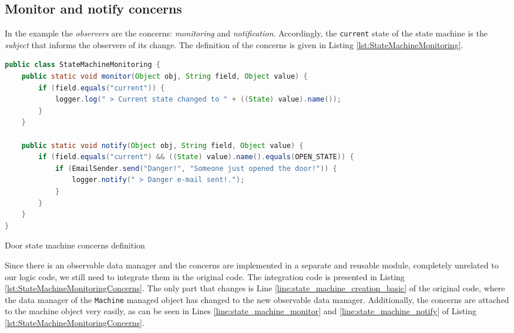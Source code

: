 \subsection{Monitor and notify concerns}
In the example the \textit{observers} are the concerns: \textit{monitoring} and \textit{notification}. 
Accordingly, the \texttt{current} state of the state machine is the \textit{subject} that informs the observers of its change.
The definition of the concerns is given in Listing \ref{lst:StateMachineMonitoring}.

\begin{sourcecode} [H]
	\begin{lstlisting}[language=Java, escapechar=|]
public class StateMachineMonitoring {
    public static void monitor(Object obj, String field, Object value) {
        if (field.equals("current")) {
            logger.log(" > Current state changed to " + ((State) value).name());
        }
    }

    public static void notify(Object obj, String field, Object value) {
        if (field.equals("current") && ((State) value).name().equals(OPEN_STATE)) {
            if (EmailSender.send("Danger!", "Someone just opened the door!")) {
            	logger.notify(" > Danger e-mail sent!.");
            }
        }
    }
}
	\end{lstlisting}
	\caption{Door state machine concerns definition}
	\label{lst:StateMachineMonitoring}
\end{sourcecode}

Since there is an observable data manager and the concerns are implemented in a separate and reusable module, completely unrelated to our logic code, we still need to integrate them in the original code.
The integration code is presented in Listing \ref{lst:StateMachineMonitoringConcerns}.
The only part that changes is Line \ref{line:state_machine_creation_basic} of the original code, where the data manager of the \texttt{Machine} managed object has changed to the new observable data manager.
Additionally, the concerns are attached to the machine object very easily, as can be seen in Lines \ref{line:state_machine_monitor} and \ref{line:state_machine_notify} of Listing \ref{lst:StateMachineMonitoringConcerns}.


